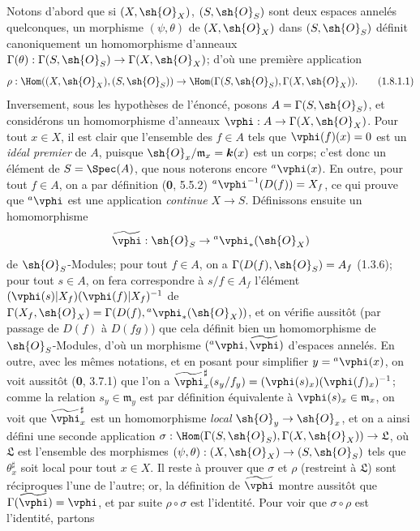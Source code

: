 Notons d'abord que si $(X,\sh{O}_X)$, $(S,\sh{O}_S)$ sont deux espaces
annelés quelconques, un morphisme $(\psi,\theta)$ de $(X,\sh{O}_X)$
dans $(S,\sh{O}_S)$ définit canoniquement un homomorphisme d'anneaux
$\Gamma(\theta):\Gamma(S,\sh{O}_S)\to\Gamma(X,\sh{O}_X)$; d'où une
première application
\begin{equation}
\label{ega2:addendum:I.1.8.1.1-fr}
  \rho:\Hom((X,\sh{O}_X),(S,\sh{O}_S))
  \to\Hom(\Gamma(S,\sh{O}_S),\Gamma(X,\sh{O}_X)).
\tag{1.8.1.1}
\end{equation}
Inversement, sous les hypothèses de l'énoncé, posons
$A=\Gamma(S,\sh{O}_S)$, et considérons un homomorphisme d'anneaux
$\vphi:A\to\Gamma(X,\sh{O}_X)$. Pour tout $x\in X$, il est clair que
l'ensemble des $f\in A$ tels que $\vphi(f)(x)=0$ est un \emph{idéal premier}
de $A$, puisque $\sh{O}_x/\mathfrak m_x=\boldsymbol{k}(x)$ est un corps; c'est
donc un élément de $S=\Spec(A)$, que nous noterons encore
${}^a\vphi(x)$. En outre, pour tout $f\in A$, on a par définition
(\textbf{0}, 5.5.2)
${}^a\vphi^{-1}(D(f))=X_f$,
ce qui prouve que ${}^a\vphi$ est une application \emph{continue} $X\to S$.
Définissons ensuite un homomorphisme
\[
  \widetilde{\vphi}:\sh{O}_S\to{}^a\vphi_*(\sh{O}_X)
\]
de $\sh{O}_S$-Modules; pour tout $f\in A$, on a
$\Gamma(D(f),\sh{O}_S)=A_f$ (1.3.6); pour tout $s\in A$, on fera
correspondre à $s/f\in A_f$ l'élément $(\vphi(s)|X_f)(\vphi(f)|X_f)^{-1}$ de
$\Gamma(X_f,\sh{O}_X)=\Gamma(D(f),{}^a\vphi_*(\sh{O}_X))$,
et on vérifie aussitôt (par passage de $D(f)$ à $D(fg)$) que cela
définit bien un homomorphisme de $\sh{O}_S$-Modules, d'où un morphisme
$({}^a\vphi,\widetilde{\vphi})$ d'espaces annelés. En outre, avec les
mêmes notations, et en posant pour simplifier $y={}^a\vphi(x)$, on voit
aussitôt (\textbf{0}, 3.7.1) que l'on a
$\widetilde{\vphi}_x^\sharp(s_y/f_y)=(\vphi(s)_x)(\vphi(f)_x)^{-1}$;
comme la relation $s_y\in\mathfrak m_y$ est par définition équivalente
à $\vphi(s)_x\in\mathfrak m_x$, on voit que
$\widetilde{\vphi}_x^\sharp$ est un homomorphisme \emph{local}
$\sh{O}_y\to\sh{O}_x$, et on a ainsi défini une seconde application
$\sigma:\Hom(\Gamma(S,\sh{O}_S),\Gamma(X,\sh{O}_X))\to\mathfrak L$,
où $\mathfrak L$ est l'ensemble des morphismes
$(\psi,\theta):(X,\sh{O}_X)\to(S,\sh{O}_S)$ tels que
$\theta_x^\sharp$ soit local pour tout $x\in X$.
Il reste à prouver que $\sigma$ et $\rho$ (restreint à $\mathfrak L$)
sont réciproques l'une de l'autre; or, la définition de
$\widetilde{\vphi}$ montre aussitôt que
$\Gamma(\widetilde{\vphi})=\vphi$, et par suite $\rho\circ\sigma$ est
l'identité. Pour voir que $\sigma\circ\rho$ est l'identité, partons
